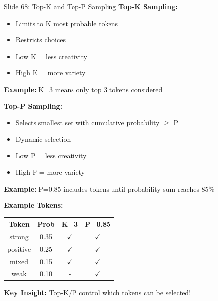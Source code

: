 \documentclass[8pt]{beamer}
\begin{document}
	\begin{frame}{Slide 68: Top-K and Top-P Sampling}
		\fontsize{6.5}{7.5}\selectfont
		\textbf{Top-K Sampling:}
		\begin{itemize}
			\item Limits to K most probable tokens
			\item Restricts choices
			\item Low K = less creativity
			\item High K = more variety
		\end{itemize}
		\textbf{Example:} K=3 means only top 3 tokens considered
		
		\vspace{0.1cm}
		\textbf{Top-P Sampling:}
		\begin{itemize}
			\item Selects smallest set with cumulative probability $\ge$ P
			\item Dynamic selection
			\item Low P = less creativity
			\item High P = more variety
		\end{itemize}
		\textbf{Example:} P=0.85 includes tokens until probability sum reaches 85\%
		
		\vspace{0.1cm}
		\textbf{Example Tokens:}
		\begin{tabular}{|c|c|c|c|}
			\hline
			\textbf{Token} & \textbf{Prob} & \textbf{K=3} & \textbf{P=0.85} \\
			\hline
			strong & 0.35 & $\checkmark$ & $\checkmark$ \\
			positive & 0.25 & $\checkmark$ & $\checkmark$ \\
			mixed & 0.15 & $\checkmark$ & $\checkmark$ \\
			weak & 0.10 & - & $\checkmark$ \\
			\hline
		\end{tabular}
		
		\textcolor{myblue}{\textbf{Key Insight:}} Top-K/P control which tokens can be selected!
	\end{frame}
	
\end{document}
